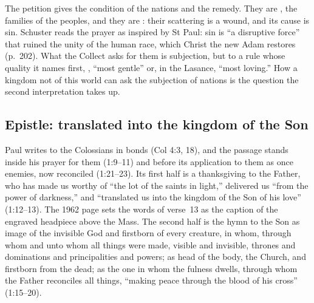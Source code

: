 The petition gives the condition of the nations and the remedy. They are
, the families of the peoples, and they are
: their scattering is a wound, and its cause
is sin. Schuster reads the prayer as inspired by St Paul: sin is ``a
disruptive force'' that ruined the unity of the human race, which Christ the
new Adam restores (p.~202). What the Collect asks for them is subjection, but
to a rule whose quality it names first, , ``most
gentle'' or, in the Lasance, ``most loving.'' How a kingdom not of this world
can ask the subjection of nations is the question the second interpretation
takes up.

\subsection{Epistle: translated into the kingdom of the Son}
\label{sec:element-epistle}

Paul writes to the Colossians in bonds (Col 4:3, 18), and the passage stands
inside his prayer for them (1:9--11) and before its application to them as
once enemies, now reconciled (1:21--23). Its first half is a thanksgiving to
the Father, who has made us worthy of ``the lot of the saints in light,''
delivered us ``from the power of darkness,'' and ``translated us into the
kingdom of the Son of his love'' (1:12--13). The 1962 page sets the words of
verse~13 as the caption of the engraved headpiece above the Mass. The
second half is the hymn to the Son as image of the invisible God and firstborn
of every creature, in whom, through whom and unto whom all things were made,
visible and invisible, thrones and dominations and principalities and powers;
as head of the body, the Church, and firstborn from the dead; as the one in
whom the fulness dwells, through whom the Father reconciles all things,
``making peace through the blood of his cross'' (1:15--20).

